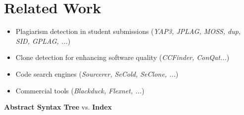 
\section{Related Work}
\begin{frame}{\insertsection}
	\begin{itemize}
	\normalsize
	\item Plagiarism detection in student submissions (\textit{YAP3, JPLAG, MOSS, dup, SID, GPLAG, ...})
	\item Clone detection for enhancing software quality (\textit{CCFinder, ConQat...})
	\item Code search engines (\textit{Sourcerer, SeCold, SeClone, ...})
	\item Commercial tools (\textit{Blackduck, Flexnet, ...})
	\end{itemize}
	
	\pause
	
	\begin{center}
		\textbf{Abstract Syntax Tree} vs. \textbf{Index}
	\end{center}
\end{frame}